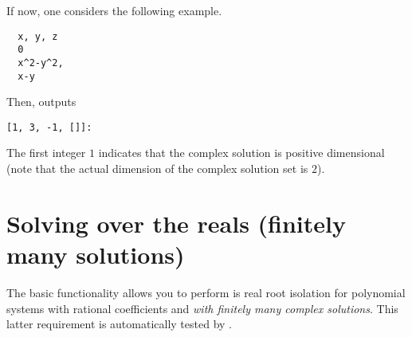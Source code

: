 \documentclass[a4paper,english,11pt]{scrartcl}
\theoremstyle{definition}
\theoremstyle{remark}
\begin{document}
If now, one considers the following example.
\begin{tcolorbox}
\begin{verbatim}
  x, y, z
  0
  x^2-y^2,
  x-y
\end{verbatim}
\end{tcolorbox}
Then, \msolve outputs
\begin{tcolorbox}
\begin{verbatim}
[1, 3, -1, []]:
\end{verbatim}
\end{tcolorbox}
The first integer $1$ indicates that the complex solution is positive
dimensional (note that the actual dimension of the complex solution set is $2$).


\section{Solving over the reals (finitely many solutions)}\label{sec:solvingreals}

The basic functionality \msolve allows you to perform is real root
isolation for polynomial systems with rational coefficients and {\em with
  finitely many complex solutions}. This latter requirement is automatically
tested by \msolve. 
\end{document}
